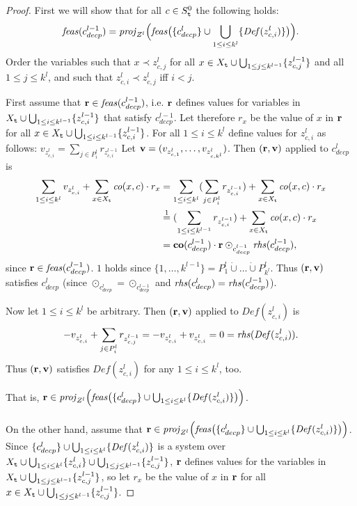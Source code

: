 \lmmmm*
\begin{proof}
First we will show that for all $c\in S_{\texttt{t}}^0$ the following holds:
\begin{equation}\label{eq:step}
\mathit{feas}(c^{l-1}_{decp}) = \mathit{proj}_{Z^l}\Big(\mathit{feas}\big(\{c^l_{decp}\}\cup\bigcup_{1\leq i\leq k^l}\{\mathit{Def}(z^l_{c,i})\}\big)\Big).
\end{equation}
Order the variables such that $x\prec z^{l}_{c,j}$ for all $x\in X_{\texttt{t}} \cup\bigcup_{1\leq j\leq k^{l-1}}\{z^{l-1}_{c,j}\}$ and all $1\leq j\leq k^l$, and such that $z^{l}_{c,i}\prec z^{l}_{c,j}$ iff $i<j$. 

First assume that  $\mathbf{r}\in\mathit{feas}(c^{l-1}_{decp})$, i.e. $\mathbf{r}$ defines values for variables in $X_{\texttt{t}}\cup \bigcup_{1\leq i\leq k^{l-1}}\{z^{l-1}_{c,i}\}$ that satisfy $c^{l-1}_{decp}$. Let therefore $r_x$ be the value of $x$ in $\mathbf{r}$ for all $x\in X_{\texttt{t}}\cup \bigcup_{1\leq i\leq k^{l-1}}\{z^{l-1}_{c,i}\}$.
For all $1\leq i\leq k^l$ define values for $z^l_{c,i}$ as follows: 
$v_{z^l_{c,i}} = \sum_{j\in P^l_i}r_{z^{l-1}_{c,i}}$ %
Let $\mathbf{v} = (v_{z^l_{c,1}}, \ldots, v_{z^l_{c,k^l}})$.
Then $(\mathbf{r},\mathbf{v})$ applied to $c^l_{decp}$ is
\begin{align*}
\sum_{1\leq i \leq k^l}v_{z^l_{c,i}} + \sum_{x\in X_{\texttt{t}}}\mathit{co}(x,c)\cdot r_x
& = \sum_{1\leq i \leq k^l}(\sum_{j\in P^l_i}r_{z^{l-1}_{c,i}}) + \sum_{x\in X_{\texttt{t}}}\mathit{co}(x,c)\cdot r_x\\
&\overset{1}= (\sum_{1\leq i \leq k^{l-1}}r_{z^{l-1}_{c,i}}) + \sum_{x\in X_{\texttt{t}}}\mathit{co}(x,c)\cdot r_x\\
&=\mathbf{co}(c^{l-1}_{decp})\cdot\mathbf{r} \odot_{c^{l-1}_{decp}} \mathit{rhs}(c^{l-1}_{decp}),
\end{align*}
since $\mathbf{r}\in \mathit{feas}(c^{l-1}_{decp})$. $1$ holds since $\{1,\ldots,k^{l-1}\} = P^l_1\dot\cup\ldots\dot\cup P^l_{k^l}$. Thus $(\mathbf{r},\mathbf{v})$ satisfies $c^l_{decp}$ (since $\odot_{c^l_{decp}}=\odot_{c^{l-1}_{decp}}$ and $\mathit{rhs}(c^l_{decp})=\mathit{rhs}(c^{l-1}_{decp})$).

Now let $1\leq i\leq k^l$ be arbitrary. Then $(\mathbf{r},\mathbf{v})$ applied to $\mathit{Def}(z^l_{c,i})$ is
\[
-v_{z^l_{c,i}}+\sum_{j\in P^l_i}r_{z^{l-1}_{c,j}} = -v_{z^l_{c,i}} + v_{z^l_{c,i}} = 0 = \mathit{rhs}(\mathit{Def}(z^l_{c,i})).
\]
Thus $(\mathbf{r},\mathbf{v})$ satisfies $\mathit{Def}(z^l_{c,i})$ for any $1\leq i\leq k^l$, too.

That is, $\mathbf{r}\in\mathit{proj}_{Z^l}\Big(\mathit{feas}\big(\{c^l_{decp}\}\cup\bigcup_{1\leq i\leq k^l}\{\mathit{Def}(z^l_{c,i})\}\big)\Big)$.
\\\\
On the other hand, assume that 
$\mathbf{r}\in \mathit{proj}_{Z^l}\Big(\mathit{feas}\big(\{c^l_{decp}\}\cup\bigcup_{1\leq i\leq k^l}\{\mathit{Def}(z^l_{c,i})\}\big)\Big)$. Since $\{c^l_{decp}\}\cup\bigcup_{1\leq i\leq k^l}\{\mathit{Def}(z^l_{c,i})\}$ is a system over $X_{\texttt{t}}\cup \bigcup_{1\leq i\leq k^l}\{z^l_{c,i}\}\cup\bigcup_{1\leq j\leq k^{l-1}}\{z^{l-1}_{c,j}\}$, $\mathbf{r}$ defines values for the variables in $X_{\texttt{t}}\cup\bigcup_{1\leq j\leq k^{l-1}}\{z^{l-1}_{c,j}\}$, so let 
$r_x$ be the value of $x$ in $\mathbf{r}$ for all $x\in X_{\texttt{t}}\cup\bigcup_{1\leq j\leq k^{l-1}}\{z^{l-1}_{c,j}\}$.


\end{proof}
